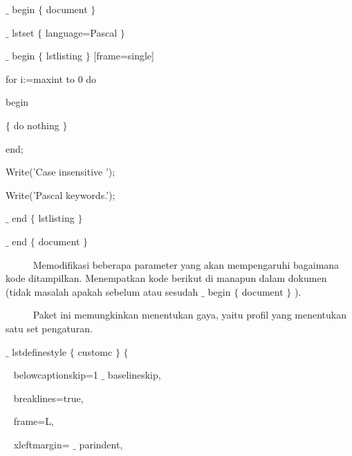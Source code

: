 \noindent  $ \_ $ begin $ \{ $ document $ \} $ \par


\noindent  $ \_ $ lstset $ \{ $ language=Pascal $ \} $ ~~~~~~~ \par


\noindent  $ \_ $ begin $ \{ $ lstlisting $ \} $ [frame=single]~ \par


\noindent for i:=maxint to 0 do\par


\noindent begin\par


\noindent  $ \{ $  do nothing  $ \} $ \par


\noindent end;\par


\noindent Write('Case insensitive ');\par


\noindent Write('Pascal keywords.');\par


\noindent  $ \_ $ end $ \{ $ lstlisting $ \} $ \par


\noindent 
\vspace{12pt}
\noindent  $ \_ $ end $ \{ $ document $ \} $ \par


\noindent ~~~~~ Memodifikasi beberapa parameter yang akan mempengaruhi bagaimana kode ditampilkan. Menempatkan kode berikut di manapun dalam dokumen (tidak masalah apakah sebelum atau sesudah  $ \_ $  begin  $ \{ $ document $ \} $ ). \par
 ~~~~~ Paket ini memungkinkan menentukan gaya, yaitu profil yang menentukan satu set pengaturan. \par
 $ \_ $ lstdefinestyle $ \{ $ customc $ \} $  $ \{ $ \par

{\fontsize{10pt}{10pt}\selectfont ~ belowcaptionskip=1 $ \_ $ baselineskip,}\par

{\fontsize{10pt}{10pt}\selectfont ~ breaklines=true,}\par

{\fontsize{10pt}{10pt}\selectfont ~ frame=L,}\par

{\fontsize{10pt}{10pt}\selectfont ~ xleftmargin= $ \_ $ parindent,}\par

